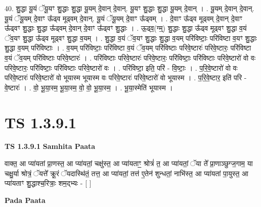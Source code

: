 \documentclass[17pt]{extarticle}
\begin{document}
40. शु॒द्धा यू॒यं ॅयू॒यꣳ शु॒द्धाः शु॒द्धा यू॒यम् दे॒वान् दे॒वान्. यू॒यꣳ शु॒द्धाः शु॒द्धा यू॒यम् दे॒वान् । . यू॒यम् दे॒वान् दे॒वान्. यू॒यं ॅयू॒यम् दे॒वाꣳ ऊ᳚ढ्व मूढ्वम् दे॒वान्. यू॒यं ॅयू॒यम् दे॒वाꣳ ऊ᳚ढ्वम् । . दे॒वाꣳ ऊ᳚ढ्व मूढ्वम् दे॒वान् दे॒वाꣳ ऊ᳚ढ्वꣳ शु॒द्धाः शु॒द्धा ऊ᳚ढ्वम् दे॒वान् दे॒वाꣳ ऊ᳚ढ्वꣳ शु॒द्धाः । . ऊ॒ढ्व॒(ग्म्॒) शु॒द्धाः शु॒द्धा ऊ᳚ढ्व मूढ्वꣳ शु॒द्धा व॒यं ॅव॒यꣳ शु॒द्धा ऊ᳚ढ्व मूढ्वꣳ शु॒द्धा व॒यम् । . शु॒द्धा व॒यं ॅव॒यꣳ शु॒द्धाः शु॒द्धा व॒यम् परि॑विष्टाः॒ परि॑विष्टा व॒यꣳ शु॒द्धाः शु॒द्धा व॒यम् परि॑विष्टाः । . व॒यम् परि॑विष्टाः॒ परि॑विष्टा व॒यं ॅव॒यम् परि॑विष्टाः परिवे॒ष्टारः॑ परिवे॒ष्टारः॒ परि॑विष्टा व॒यं ॅव॒यम् परि॑विष्टाः परिवे॒ष्टारः॑ । . परि॑विष्टाः परिवे॒ष्टारः॑ परिवे॒ष्टारः॒ परि॑विष्टाः॒ परि॑विष्टाः परिवे॒ष्टारो॑ वो वः परिवे॒ष्टारः॒ परि॑विष्टाः॒ परि॑विष्टाः परिवे॒ष्टारो॑ वः । . परि॑विष्टा॒ इति॒ परि॑ - वि॒ष्टाः॒ । . प॒रि॒वे॒ष्टारो॑ वो वः परिवे॒ष्टारः॑ परिवे॒ष्टारो॑ वो भूयास्म भूयास्म वः परिवे॒ष्टारः॑ परिवे॒ष्टारो॑ वो भूयास्म । . प॒रि॒वे॒ष्टार॒ इति॑ परि - वे॒ष्टारः॑ । . वो॒ भू॒या॒स्म॒ भू॒या॒स्म॒ वो॒ वो॒ भू॒या॒स्म॒ । . भू॒या॒स्मेति॑ भूयास्म । \newline
\pagebreak
{}
\section*{ TS 1.3.9.1 }

\textbf{TS 1.3.9.1 } \newline
\textbf{Samhita Paata} \newline

वाक्त॒ आ प्या॑यतां प्रा॒णस्त॒ आ प्या॑यतां॒ चक्षु॑स्त॒ आ प्या॑यताꣳ॒॒ श्रोत्रं॑ त॒ आ प्या॑यतां॒ ॅया ते᳚ प्रा॒णाञ्छुग्ज॒गाम॒ या चक्षु॒र्या श्रोत्रं॒ ॅयत्ते᳚ क्रू॒रं ॅयदास्थि॑तं॒ तत्त॒ आ प्या॑यतां॒ तत्त॑ ए॒तेन॑ शुन्धतां॒ नाभि॑स्त॒ आ प्या॑यतां पा॒युस्त॒ आ प्या॑यताꣳ शु॒द्धाश्च॒रित्राः॒ शम॒द्भ्यः - [ ] \newline

\textbf{Pada Paata} \newline
\end{document}
